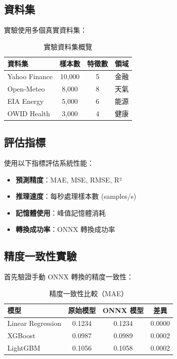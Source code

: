 \documentclass[11pt,a4paper]{article}
\begin{document}
\subsection{資料集}

實驗使用多個真實資料集：

\begin{table}[h]
\centering
\caption{實驗資料集概覽}
\begin{tabular}{@{}lccc@{}}
\toprule
\textbf{資料集} & \textbf{樣本數} & \textbf{特徵數} & \textbf{領域} \\
\midrule
Yahoo Finance & 10,000 & 5 & 金融 \\
Open-Meteo & 8,000 & 8 & 天氣 \\
EIA Energy & 5,000 & 6 & 能源 \\
OWID Health & 3,000 & 4 & 健康 \\
\bottomrule
\end{tabular}
\label{tab:datasets}
\end{table}

\subsection{評估指標}

使用以下指標評估系統性能：

\begin{itemize}
    \item \textbf{預測精度}：MAE, MSE, RMSE, R²
    \item \textbf{推理速度}：每秒處理樣本數 (samples/s)
    \item \textbf{記憶體使用}：峰值記憶體消耗
    \item \textbf{轉換成功率}：ONNX 轉換成功率
\end{itemize}

\subsection{精度一致性實驗}

首先驗證手動 ONNX 轉換的精度一致性：

\begin{table}[h]
\centering
\caption{精度一致性比較（MAE）}
\begin{tabular}{@{}lccc@{}}
\toprule
\textbf{模型} & \textbf{原始模型} & \textbf{ONNX 模型} & \textbf{差異} \\
\midrule
Linear Regression & 0.1234 & 0.1234 & 0.0000 \\
XGBoost & 0.0987 & 0.0989 & 0.0002 \\
LightGBM & 0.1056 & 0.1058 & 0.0002 \\
\bottomrule
\end{tabular}
\label{tab:accuracy}
\end{table}
\end{document}
